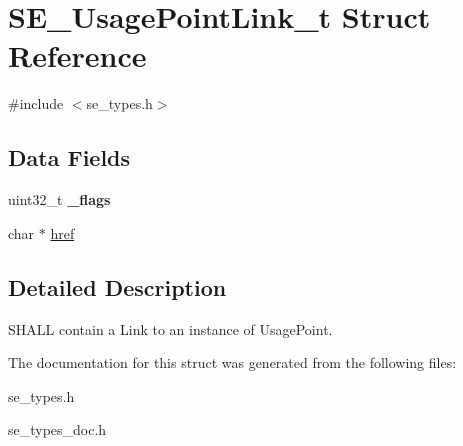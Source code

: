 \hypertarget{structSE__UsagePointLink__t}{}\section{S\+E\+\_\+\+Usage\+Point\+Link\+\_\+t Struct Reference}
\label{structSE__UsagePointLink__t}


{\ttfamily \#include $<$se\+\_\+types.\+h$>$}

\subsection*{Data Fields}
\begin{DoxyCompactItemize}
\item 
uint32\+\_\+t {\bfseries \+\_\+flags}
\item 
char $\ast$ \hyperlink{group__UsagePointLink_ga3ab372c61d11d3ad50c2e301074a7644}{href}
\end{DoxyCompactItemize}


\subsection{Detailed Description}
S\+H\+A\+LL contain a Link to an instance of Usage\+Point. 

The documentation for this struct was generated from the following files\+:\begin{DoxyCompactItemize}
\item 
se\+\_\+types.\+h\item 
se\+\_\+types\+\_\+doc.\+h\end{DoxyCompactItemize}
